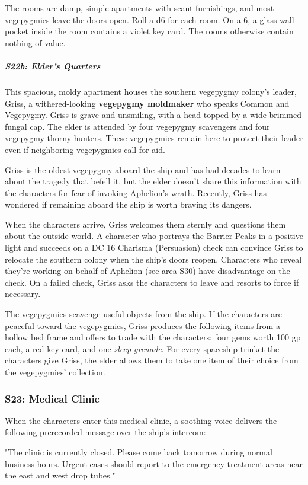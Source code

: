 \documentclass[10pt,a4paper,twoside,bg=print,twocolumn,openany,nodeprecatedcode]{dndbook}
\begin{document}
The rooms are damp, simple apartments with scant furnishings, and most vegepygmies leave the doors open. Roll a d6 for each room. On a 6, a glass wall pocket inside the room contains a violet key card. The rooms otherwise contain nothing of value.

\subparagraph{S22b: Elder's Quarters}
This spacious, moldy apartment houses the southern vegepygmy colony's leader, Griss, a withered-looking \textbf{vegepygmy moldmaker} who speaks Common and Vegepygmy. Griss is grave and unsmiling, with a head topped by a wide-brimmed fungal cap. The elder is attended by four vegepygmy scavengers and four vegepygmy thorny hunters. These vegepygmies remain here to protect their leader even if neighboring vegepygmies call for aid.

Griss is the oldest vegepygmy aboard the ship and has had decades to learn about the tragedy that befell it, but the elder doesn't share this information with the characters for fear of invoking Aphelion's wrath. Recently, Griss has wondered if remaining aboard the ship is worth braving its dangers.

When the characters arrive, Griss welcomes them sternly and questions them about the outside world. A character who portrays the Barrier Peaks in a positive light and succeeds on a DC 16 Charisma (Persuasion) check can convince Griss to relocate the southern colony when the ship's doors reopen. Characters who reveal they're working on behalf of Aphelion (see area S30) have disadvantage on the check. On a failed check, Griss asks the characters to leave and resorts to force if necessary.

The vegepygmies scavenge useful objects from the ship. If the characters are peaceful toward the vegepygmies, Griss produces the following items from a hollow bed frame and offers to trade with the characters: four gems worth 100 gp each, a red key card, and one \textit{sleep grenade}. For every spaceship trinket the characters give Griss, the elder allows them to take one item of their choice from the vegepygmies' collection.

\subsubsection{S23: Medical Clinic}
When the characters enter this medical clinic, a soothing voice delivers the following prerecorded message over the ship's intercom:

\begin{DndReadAloud}{}
"The clinic is currently closed. Please come back tomorrow during normal business hours. Urgent cases should report to the emergency treatment areas near the east and west drop tubes."

\end{DndReadAloud}
\end{document}
